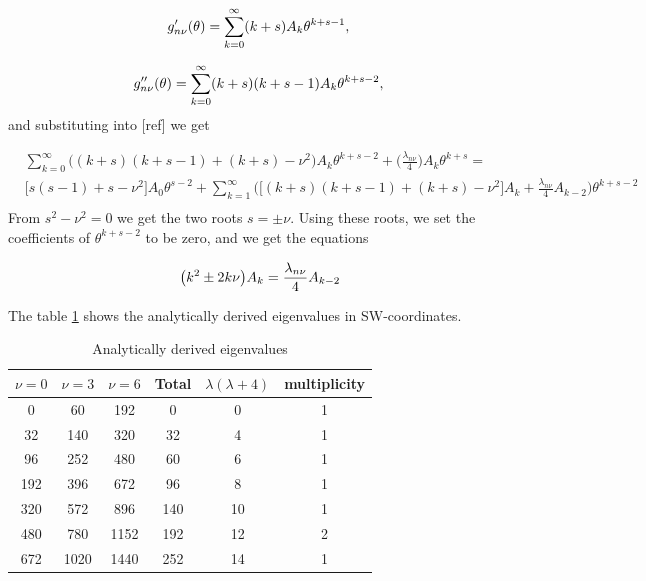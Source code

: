 \documentclass{article}
\numberwithin{equation}{section}
\numberwithin{figure}{section}
\begin{document}
\begin{equation}
g'_{n\nu}(\theta) = \sum_{k=0}^{\infty} (k+s) A_{k} \theta^{k+s-1},\\
\end{equation}


\begin{equation}
g''_{n\nu}(\theta) = \sum_{k=0}^{\infty} (k+s)(k+s-1) A_{k} \theta^{k+s-2},\\
\end{equation}
and substituting into [ref] we get

\begin{align*}
&\sum_{k=0}^{\infty} \Bigg( (k+s)(k+s-1) + (k+s) - \nu^{2}\Bigg) A_{k} \theta^{k+s-2} + \Bigg(\frac{\lambda_{n\nu}}{4}  \Bigg) A_{k} \theta^{k+s} = \\
&\big[ s(s-1) + s -\nu^{2} \big] A_{0} \theta^{s-2} + \sum_{k=1}^{\infty} \Bigg( \big[ (k+s)(k+s-1) + (k+s) - \nu^{2}  \big] A_{k} + \frac{\lambda_{n\nu}}{4} A_{k-2}\Bigg) \theta^{k+s-2}\\
\end{align*}
From $s^{2} - \nu^{2} = 0$ we get the two roots $s = \pm \nu$. Using these roots, we set the coefficients of $\theta^{k+s-2}$ to be zero, and we get the equations

\begin{equation}
\big(k^{2} \pm 2k\nu\big)A_{k} = \frac{\lambda_{n\nu}}{4} A_{k-2}\\
\end{equation} 

The table \ref{table:1} shows the analytically derived eigenvalues in SW-coordinates.

\begin{table}[h!]
	\centering
	\begin{tabular}{||c c c c c c||} 
		\hline
		$\nu=0$ & $\nu=3$ & $\nu=6$ & Total & $\lambda(\lambda+4)$& multiplicity \\ [0.5ex] 
		\hline\hline
		0		& 60     & 192 & 0 & 0 & 1  \\ 
		32	   & 140   & 320 & 32 & 4 & 1  \\
		96     & 252  & 480 & 60 & 6 & 1  \\
		192   & 396  & 672  & 96 & 8 & 1  \\
		320   & 572  & 896  & 140 & 10 & 1  \\
		480   & 780  & 1152 & 192 & 12 & 2  \\  
		672   & 1020 & 1440 & 252 & 14 & 1  \\ [1ex] 
		\hline
	\end{tabular}
	\caption{Analytically derived eigenvalues}
	\label{table:1}
\end{table} 

\printbibliography
\end{document}
